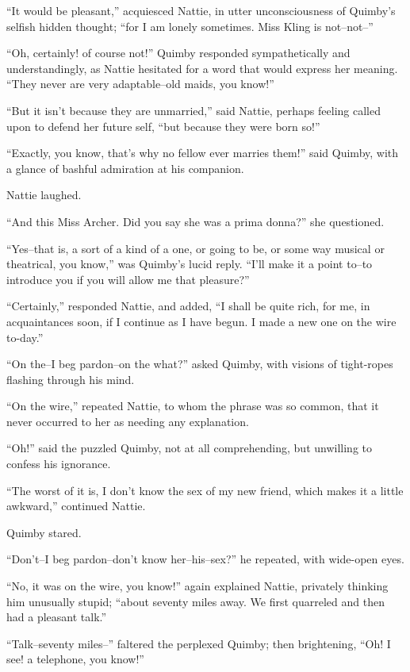 ``It would be pleasant,'' acquiesced Nattie, in utter unconsciousness of
Quimby's selfish hidden thought; ``for I am lonely sometimes. Miss Kling
is not--not--''

``Oh, certainly! of course not!'' Quimby responded sympathetically and
understandingly, as Nattie hesitated for a word that would express her
meaning. ``They never are very adaptable--old maids, you know!''

``But it isn't because they are unmarried,'' said Nattie, perhaps feeling
called upon to defend her future self, ``but because they were born so!''

``Exactly, you know, that's why no fellow ever marries them!'' said
Quimby, with a glance of bashful admiration at his companion.

Nattie laughed.

``And this Miss Archer. Did you say she was a prima donna?'' she
questioned.

``Yes--that is, a sort of a kind of a one, or going to be, or some way
musical or theatrical, you know,'' was Quimby's lucid reply. ``I'll make
it a point to--to introduce you if you will allow me that pleasure?''

``Certainly,'' responded Nattie, and added, ``I shall be quite rich, for
me, in acquaintances soon, if I continue as I have begun. I made a new
one on the wire to-day.''

``On the--I beg pardon--on the what?'' asked Quimby, with visions of
tight-ropes flashing through his mind.

``On the wire,'' repeated Nattie, to whom the phrase was so common, that
it never occurred to her as needing any explanation.

``Oh!'' said the puzzled Quimby, not at all comprehending, but unwilling
to confess his ignorance.

``The worst of it is, I don't know the sex of my new friend, which makes
it a little awkward,'' continued Nattie.

Quimby stared.

``Don't--I beg pardon--don't know her--his--sex?'' he repeated, with
wide-open eyes.

``No, it was on the wire, you know!'' again explained Nattie, privately
thinking him unusually stupid; ``about seventy miles away. We first
quarreled and then had a pleasant talk.''

``Talk--seventy miles--'' faltered the perplexed Quimby; then brightening,
``Oh! I see! a telephone, you know!''

